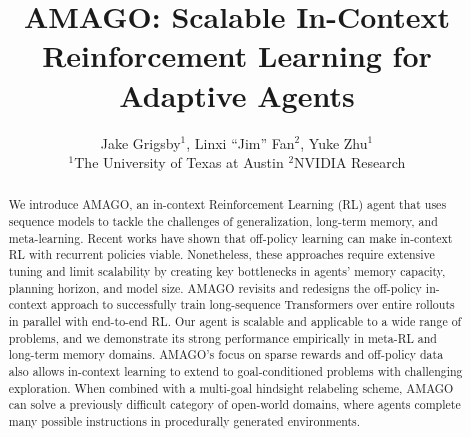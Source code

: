 \documentclass{article}
\title{AMAGO: Scalable In-Context Reinforcement Learning for Adaptive Agents}
\author{
Jake Grigsby$^{1}$, Linxi ``Jim'' Fan$^{2}$, Yuke Zhu$^{1}$\\
$^1$The University of Texas at Austin \quad
$^2$NVIDIA Research\\
}
\begin{document}
\maketitle
\begin{abstract}
We introduce AMAGO, an in-context Reinforcement Learning (RL) agent that uses sequence models to tackle the challenges of generalization, long-term memory, and meta-learning. Recent works have shown that off-policy learning can make in-context RL with recurrent policies viable. Nonetheless, these approaches require extensive tuning and limit scalability by creating key bottlenecks in agents' memory capacity, planning horizon, and model size. AMAGO revisits and redesigns the off-policy in-context approach to successfully train long-sequence Transformers over entire rollouts in parallel with end-to-end RL. Our agent is scalable and applicable to a wide range of problems, and we demonstrate its strong performance empirically in meta-RL and long-term memory domains. AMAGO's focus on sparse rewards and off-policy data also allows in-context learning to extend to goal-conditioned problems with challenging exploration. When combined with a multi-goal hindsight relabeling scheme, AMAGO can solve a previously difficult category of open-world domains, where agents complete many possible instructions in procedurally generated environments.
\end{abstract}
\end{document}
